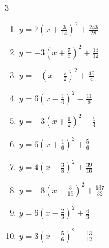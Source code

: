 \begin{multicols}{3}
\begin{enumerate}
  \item $\displaystyle y=7\left( x+\frac{3}{14}\right)^{2}+\frac{243}{28}$


  \item $\displaystyle y=-3\left( x+\frac{7}{6}\right)^{2}+\frac{13}{12}$


  \item $\displaystyle y=-\left( x-\frac{7}{2}\right)^{2}+\frac{49}{4}$


  \item $\displaystyle y=6\left( x-\frac{1}{4}\right)^{2}-\frac{11}{8}$


  \item $\displaystyle y=-3\left( x+\frac{1}{2}\right)^{2}-\frac{5}{4}$


  \item $\displaystyle y=6\left( x+\frac{1}{6}\right)^{2}+\frac{5}{6}$


  \item $\displaystyle y=4\left( x-\frac{3}{8}\right)^{2}+\frac{39}{16}$


  \item $\displaystyle y=-8\left( x-\frac{3}{16}\right)^{2}+\frac{137}{32}$


  \item $\displaystyle y=6\left( x-\frac{2}{3}\right)^{2}+\frac{4}{3}$


  \item $\displaystyle y=3\left( x-\frac{5}{6}\right)^{2}-\frac{13}{12}$


\end{enumerate}
\end{multicols}
